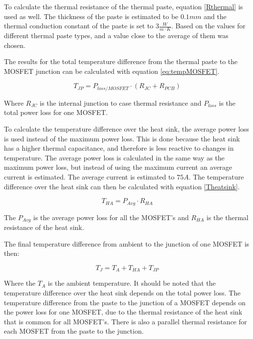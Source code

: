 To calculate the thermal resistance of the thermal paste, equation \ref{Rthermal} is used as well. The thickness of the paste is estimated to be $0.1 mm$ and the thermal conduction constant of the paste is set to $3 \frac{W}{m \cdot K}$. Based on the values for different thermal paste types, and a value close to the average of them was chosen.

The results for the total temperature difference from the thermal paste to the MOSFET junction can be calculated with equation \ref{eq:tempMOSFET}.

    \begin{equation}
        T_{JP} = P_{loss/MOSFET} \cdot (R_{JC} + R_{PCB})
        \label{eq:tempMOSFET}
    \end{equation}
    
Where $R_{JC}$ is the internal junction to case thermal resistance and $P_{loss}$ is the total power loss for one MOSFET. 

To calculate the temperature difference over the heat sink, the average power loss is used instead of the maximum power loss. This is done because the heat sink has a higher thermal capacitance, and therefore is less reactive to changes in temperature. The average power loss is calculated in the same way as the maximum power loss, but instead of using the maximum current an average current is estimated. The average current is estimated to $75 A$.
The temperature difference over the heat sink can then be calculated with equation \ref{Theatsink}.

    \begin{equation}
        T_{HA} = P_{Avg} \cdot R_{HA}
        \label{Theatsink}
    \end{equation}

The $P_{Avg}$ is the average power loss for all the MOSFET's and $R_{HA}$ is the thermal resistance of the heat sink. 

The final temperature difference from ambient to the junction of one MOSFET is then:

    \begin{equation}
        T_{J} = T_A + T_{HA} + T_{JP}
        \label{Theatsink}
    \end{equation}
    
Where the $T_A$ is the ambient temperature. 
It should be noted that the temperature difference over the heat sink depends on the total power loss. 
The temperature difference from the paste to the junction of a MOSFET depends on the power loss for one MOSFET, due to the thermal resistance of the heat sink that is common for all MOSFET's.
There is also a parallel thermal resistance for each MOSFET from the paste to the junction.

